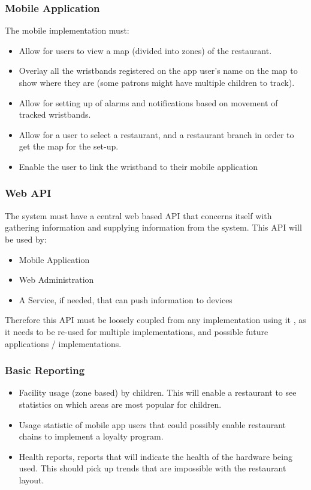 \documentclass[11pt,titlepage]{article} %
\begin{document}
	\subsubsection{Mobile Application}
The mobile implementation must:
\begin{itemize}
\item Allow for users to view a map (divided into zones) of the restaurant.
\item Overlay all the wristbands registered on the app user’s name on the map to show 
where they are (some patrons might have multiple children to track).
\item Allow  for  setting  up  of  alarms  and  notifications  based  on  movement  of  tracked 
wristbands. 
\item Allow for a user to select a restaurant, and a restaurant branch in order to get the 
map for the set-up. 
\item Enable the user to link the wristband to their  mobile application
\end{itemize}

	\subsubsection{Web API}
	The  system  must  have  a  central  web  based  API  that  concerns  itself  with  gathering 
information and supplying information from the system. This API will be used by:
\begin{itemize}
\item Mobile Application
\item Web Administration
\item A Service, if needed, that can push information to devices
\end{itemize}
Therefore this API must be loosely coupled from any implementation using it ,  as it needs to 
be re-used for multiple implementations, and possible future applications / implementations.

	\subsubsection{Basic Reporting}
	\begin{itemize}
	\item Facility usage  (zone based) by children. This will enable a restaurant to see statistics 
on which areas are most popular for children.
\item Usage statistic of mobile app users that could possibly enable restaurant chains to 
implement a loyalty program.
\item Health reports, reports that will indicate the health of the hardware being used. This should pick up trends that are impossible with the restaurant layout.
\end{itemize}	
\end{document}
